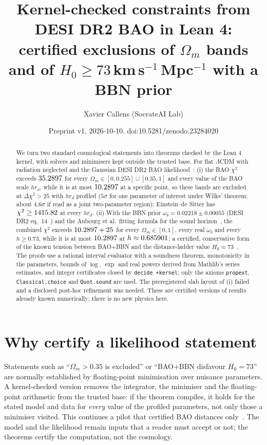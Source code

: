 \documentclass[11pt]{article}
\title{Kernel-checked constraints from DESI DR2 BAO in Lean 4:\\
certified exclusions of $\Omega_m$ bands and of $H_0\ge 73$\,km\,s$^{-1}$\,Mpc$^{-1}$ with a BBN prior}
\author{Xavier Callens (SocrateAI Lab)}
\date{Preprint v1, 2026-10-10. doi:10.5281/zenodo.23284020}
\begin{document}
\maketitle

\begin{abstract}
We turn two standard cosmological statements into theorems checked by the Lean 4 kernel, with solvers and minimisers kept outside the
trusted base. For flat $\Lambda$CDM with radiation neglected and the Gaussian DESI DR2 BAO likelihood~\cite{desi}:
(i) the BAO $\chi^2$ exceeds $35.2897$ for every $\Omega_m\in[0,0.255]\cup[0.35,1]$ and every value of the BAO scale $h r_d$, while it is at most $10.2897$ at a
specific point, so these bands are excluded at $\Delta\chi^2>25$ with $h r_d$ profiled ($5\sigma$ for one parameter of interest under Wilks' theorem; about $4.6\sigma$
if read as a joint two-parameter region); Einstein--de Sitter has $\chi^2\ge1415.82$ at every $h r_d$.
(ii) With the BBN prior $\omega_b=0.02218\pm0.00055$ (DESI DR2 eq.~14~\cite{desi,bbn}) and the Aubourg et al.\ fitting formula for the sound horizon~\cite{aubourg},
the combined $\chi^2$ exceeds $10.2897+25$ for every $\Omega_m\in[0,1]$, every real $\omega_b$ and every $h\ge0.73$, while it is at most $10.2897$ at $h\approx0.685901$:
a certified, conservative form of the known tension between BAO+BBN and the distance-ladder value $H_0\approx73$~\cite{shoes}.
The proofs use a rational interval evaluator with a soundness theorem, monotonicity in the parameters, bounds of $\log$, $\exp$ and real powers
derived from Mathlib's series estimates, and integer certificates closed by \texttt{decide +kernel}; only the axioms \texttt{propext},
\texttt{Classical.choice} and \texttt{Quot.sound} are used. The preregistered slab layout of (i) failed and a disclosed post-hoc refinement was needed.
These are certified versions of results already known numerically; there is no new physics here.
\end{abstract}

\section{Why certify a likelihood statement}
Statements such as ``$\Omega_m>0.35$ is excluded'' or ``BAO+BBN disfavour $H_0=73$'' are normally established by floating-point minimisation over
nuisance parameters. A kernel-checked version removes the integrator, the minimiser and the floating-point arithmetic from the trusted base: if the
theorem compiles, it holds for the stated model and data for \emph{every} value of the profiled parameters, not only those a minimiser visited. This
continues a pilot that certified BAO distances only~\cite{p1}. The model and the likelihood remain inputs that a reader must accept or not; the theorems
certify the computation, not the cosmology.
\end{document}
